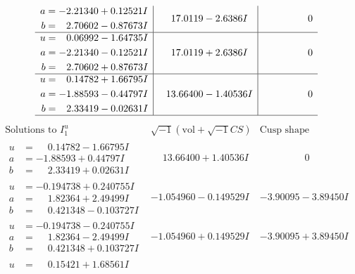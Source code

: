 \documentclass[1p]{elsarticle_modified}
\theoremstyle{definition}
\newcommand{\I}{\sqrt{-1}}
\begin{document}
$$\begin{array}{c|c|c}
\begin{aligned}
a &= -2.21340 + 0.12521 I \\
b &= \phantom{-}2.70602 - 0.87673 I\end{aligned}
 & \phantom{-}17.0119 - 2.6386 I & \phantom{-0.000000 } 0 \\ \hline\begin{aligned}
u &= \phantom{-}0.06992 - 1.64735 I \\
a &= -2.21340 - 0.12521 I \\
b &= \phantom{-}2.70602 + 0.87673 I\end{aligned}
 & \phantom{-}17.0119 + 2.6386 I & \phantom{-0.000000 } 0 \\ \hline\begin{aligned}
u &= \phantom{-}0.14782 + 1.66795 I \\
a &= -1.88593 - 0.44797 I \\
b &= \phantom{-}2.33419 - 0.02631 I\end{aligned}
 & \phantom{-}13.66400 - 1.40536 I & \phantom{-0.000000 } 0\\
 \hline 
 \end{array}$$\newpage$$\begin{array}{c|c|c}  
\text{Solutions to }I^u_{1}& \I (\text{vol} + \sqrt{-1}CS) & \text{Cusp shape}\\
 \hline 
\begin{aligned}
u &= \phantom{-}0.14782 - 1.66795 I \\
a &= -1.88593 + 0.44797 I \\
b &= \phantom{-}2.33419 + 0.02631 I\end{aligned}
 & \phantom{-}13.66400 + 1.40536 I & \phantom{-0.000000 } 0 \\ \hline\begin{aligned}
u &= -0.194738 + 0.240755 I \\
a &= \phantom{-}1.82364 + 2.49499 I \\
b &= \phantom{-}0.421348 - 0.103727 I\end{aligned}
 & -1.054960 - 0.149529 I & -3.90095 - 3.89450 I \\ \hline\begin{aligned}
u &= -0.194738 - 0.240755 I \\
a &= \phantom{-}1.82364 - 2.49499 I \\
b &= \phantom{-}0.421348 + 0.103727 I\end{aligned}
 & -1.054960 + 0.149529 I & -3.90095 + 3.89450 I \\ \hline\begin{aligned}
u &= \phantom{-}0.15421 + 1.68561 I \\

\end{aligned}
\end{array}$$
\end{document}
